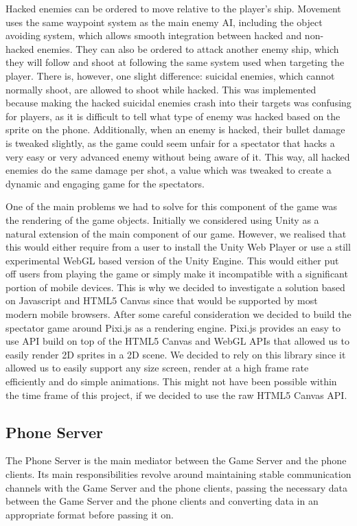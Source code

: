 \documentclass[a4paper,11pt]{article}
\begin{document}
Hacked enemies can be ordered to move relative to the player’s ship. Movement uses the same waypoint system as the main enemy AI, including the object avoiding system, which allows smooth integration between hacked and non-hacked enemies. They can also be ordered to attack another enemy ship, which they will follow and shoot at following the same system used when targeting the player. There is, however, one slight difference: suicidal enemies, which cannot normally shoot, are allowed to shoot while hacked. This was implemented because making the hacked suicidal enemies crash into their targets was confusing for players, as it is difficult to tell what type of enemy was hacked based on the sprite on the phone. Additionally, when an enemy is hacked, their bullet damage is tweaked slightly, as the game could seem unfair for a spectator that hacks a very easy or very advanced enemy without being aware of it. This way, all hacked enemies do the same damage per shot, a value which was tweaked to create a dynamic and engaging game for the spectators.

One of the main problems we had to solve for this component of the game was the rendering of the game objects. Initially we considered using Unity as a natural extension of the main component of our game. However, we realised that this would either require from a user to install the Unity Web Player or use a still experimental WebGL based version of the Unity Engine. This would either put off users from playing the game or simply make it incompatible with a significant portion of mobile devices. This is why we decided to investigate a solution based on Javascript and HTML5 Canvas\cite{html5_canvas} since that would be supported by most modern mobile browsers. After some careful consideration we decided to build the spectator game around Pixi.js\cite{pixi_js} as a rendering engine. Pixi.js provides an easy to use API build on top of the HTML5 Canvas and WebGL APIs that allowed us to easily render 2D sprites in a 2D scene. We decided to rely on this library since it allowed us to easily support any size screen, render at a high frame rate efficiently and do simple animations. This might not have been possible within the time frame of this project, if we decided to use the raw HTML5 Canvas API.

\subsection{Phone Server}
The Phone Server is the main mediator between the Game Server and the phone clients. Its main responsibilities revolve around maintaining stable communication channels with the Game Server and the phone clients, passing the necessary data between the Game Server and the phone clients and converting data in an appropriate format before passing it on.
\end{document}
